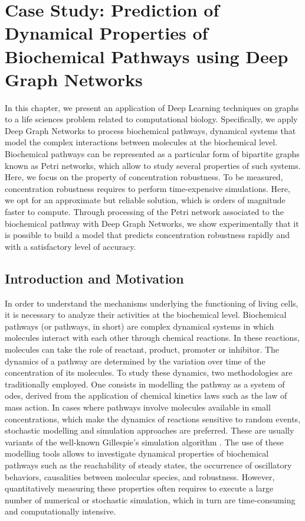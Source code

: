 \chapter{Case Study: Prediction of Dynamical Properties of Biochemical Pathways using Deep Graph Networks}\label{ch:prediction-biochemical-dgn}

In this chapter, we present an application of Deep Learning techniques on graphs to a life sciences problem related to computational biology. Specifically, we apply Deep Graph Networks to process biochemical pathways, \ie dynamical systems that model the complex interactions between molecules at the biochemical level. Biochemical pathways can be represented as a particular form of bipartite graphs known as Petri networks, which allow to study several properties of such systems. Here, we focus on the property of concentration robustness. To be measured, concentration robustness requires to perform time-expensive simulations. Here, we opt for an approximate but reliable solution, which is orders of magnitude faster to compute. Through processing of the Petri network associated to the biochemical pathway with Deep Graph Networks, we show experimentally that it is possible to build a model that predicts concentration robustness rapidly and with a satisfactory level of accuracy.

\section{Introduction and Motivation}
In order to understand the mechanisms underlying the functioning of living cells, it is necessary to analyze their activities at the biochemical level. Biochemical pathways (or pathways, in short) are complex dynamical systems in which molecules interact with each other through chemical reactions. In these reactions, molecules can take the role of reactant, product, promoter or inhibitor. The dynamics of a pathway are determined by the variation over time of the concentration of its molecules. To study these dynamics, two methodologies are traditionally employed. One consists in modelling the pathway as a system of \glspl{ode}, derived from the application of chemical kinetics laws such as the law of mass action. In cases where pathways involve molecules available in small concentrations, which make the dynamics of reactions sensitive to random events, stochastic modelling and simulation approaches are preferred. These are usually variants of the well-known Gillespie's simulation algorithm \citep{gillespie1977exact}. The use of these modelling tools allows to investigate dynamical properties of biochemical pathways such as the reachability of steady states, the occurrence of oscillatory behaviors, causalities between molecular species, and robustness. However, quantitatively measuring these properties often requires to execute a large number of numerical or stochastic simulation, which in turn are time-consuming and computationally intensive.

